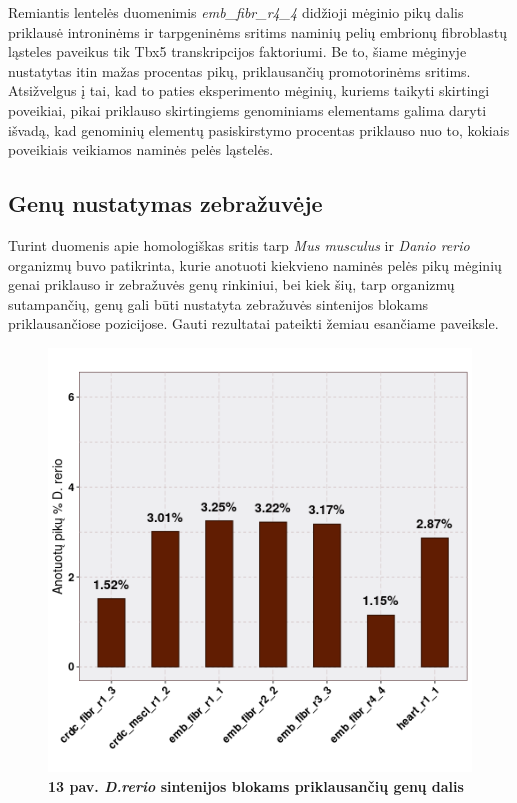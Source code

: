 \documentclass[12pt]{article}
\begin{document}
Remiantis lentelės duomenimis \emph{emb\_fibr\_r4\_4} didžioji mėginio pikų
dalis priklausė introninėms ir tarpgeninėms sritims naminių pelių embrionų
fibroblastų ląsteles paveikus tik Tbx5 transkripcijos faktoriumi. Be to, šiame
mėginyje nustatytas itin mažas procentas pikų, prik\-lau\-san\-čių promotorinėms
sritims. Atsižvelgus į tai, kad to paties eksperimento mėginių, kuriems taikyti
skirtingi poveikiai, pikai priklauso skirtingiems genominiams elementams galima
daryti išvadą, kad genominių elementų pasiskirstymo procentas priklauso nuo to,
kokiais poveikiais veikiamos naminės pelės ląstelės.

\newpage

\subsection{Genų nustatymas zebražuvėje}
Turint duomenis apie homologiškas sritis tarp \emph{Mus musculus} ir
\emph{Danio rerio} organizmų buvo patikrinta, kurie anotuoti kiekvieno naminės
pelės pikų mėginių genai priklauso ir zebražuvės genų rinkiniui, bei kiek šių,
tarp organizmų sutampančių, genų gali būti nustatyta zebražuvės sintenijos
blokams priklausančiose pozicijose. Gauti rezultatai pateikti žemiau esančiame
paveiksle.

\begin{figure}[htb]
    \begin{center}
        \includegraphics[width=0.7\linewidth]{../Figures/Unique_genes_DR.png}
        \vspace{-2\baselineskip}
        \caption*{\small\textbf{13 pav. \emph{D.rerio} sintenijos blokams
        priklausančių genų dalis}}
        \label{fig:birds}
    \end{center}
\end{figure}
\end{document}
